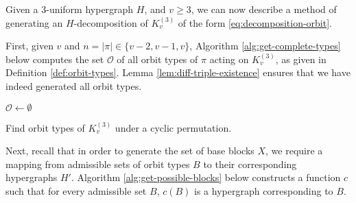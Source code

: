 Given a $3$-uniform hypergraph $H$, and $v \geq 3$, we can now describe a method of generating an $H$-decomposition of $K_{v}^{(3)}$ of the form \eqref{eq:decomposition-orbit}.

First, given $v$ and $n = |\pi| \in \{v-2, v-1, v\}$, Algorithm \ref{alg:get-complete-types} below computes the set $\mathcal{O}$ of all orbit types of $\pi$ acting on $K_{v}^{(3)}$, as given in Definition \ref{def:orbit-types}.
Lemma \ref{lem:diff-triple-existence} ensures that we have indeed generated all orbit types.

\begin{algorithm}

$\mathcal{O} \gets \emptyset$\;




\;

\caption{Find orbit types of $K_v^{(3)}$ under a cyclic permutation.} \label{alg:get-complete-types}
\end{algorithm}

Next, recall that in order to generate the set of base blocks $X$, we require a mapping from admissible sets of orbit types $B$ to their corresponding hypergraphs $H'$.
Algorithm \ref{alg:get-possible-blocks} below constructs a function $c$ such that for every admissible set $B$, $c(B)$ is a hypergraph corresponding to $B$.

